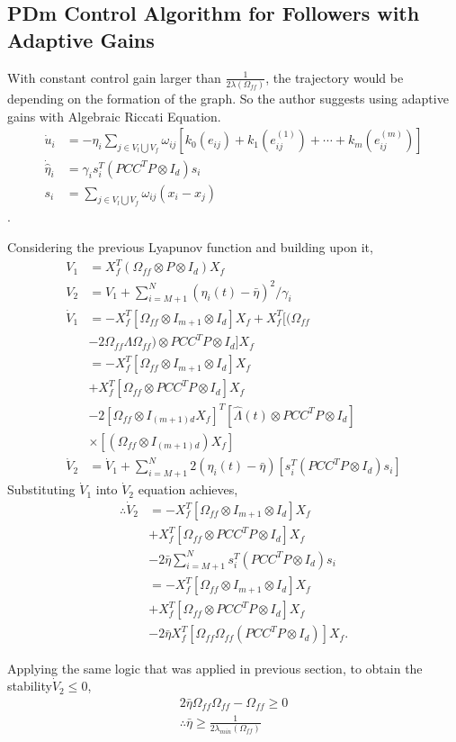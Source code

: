 \subsection*{PDm Control Algorithm for Followers with Adaptive Gains} \label{PDm_Control_Algorithm_Followers_with_Adaptive_gains}

 With constant control gain larger than $\frac{1}{2\lambda(\Omega_{ff})}$, the trajectory would be depending on the formation of the graph. So the author suggests using adaptive gains with Algebraic Riccati Equation. 
 \begin{align*}
   \dot u_i &= -\eta_i \sum_{j \in V_l\bigcup V_f } \omega_{ij}[k_0(e_{ij}) + k_1(e_{ij}^{(1)}) + \cdots +k_m(e_{ij}^{(m)})]\\
   \dot {\hat \eta}_i &=\gamma_i s_i^T(PCC^TP \otimes I_d)s_i\\
   s_i &= \sum_{j \in V_l \bigcup V_f} \omega_{ij}(x_i - x_j)
 \end{align*}.

 Considering the previous Lyapunov function and building upon it, 
 \begin{align*}
   V_{1} &= X_f^T (\Omega_{ff} \otimes P \otimes I_d) X_f\\
   V_{2} &= V_{1} + \sum_{i = M+1}^{N}(\hat \eta_i(t) - \bar \eta)^2/\gamma_i\\
   \dot V_{1} &= - X_f^T [\Omega_{ff}\otimes I_{m+1} \otimes I_d] X_f + X_f^T [(\Omega_{ff} \\
   &- 2\Omega_{ff}\Lambda\Omega_{ff})\otimes PCC^TP \otimes I_d]X_f\\
   &=- X_f^T [\Omega_{ff}\otimes I_{m+1} \otimes I_d] X_f \\
   &+X_f^T [\Omega_{ff}\otimes PCC^TP \otimes I_d]X_f\\
   &- 2[\Omega_{ff}\otimes I_{(m+1)d}X_f]^T[\hat \Lambda(t) \otimes PCC^TP \otimes I_d]\\
   &\times [(\Omega_{ff}\otimes I_{(m+1)d})X_f]\\
   \dot V_{2} &= \dot V_{1} + \sum_{i = M+1}^{N} 2(\hat \eta_i(t) - \bar \eta)[s_i^T(PCC^TP \otimes I_d)s_i]
 \end{align*}
 Substituting $\dot V_1$ into $\dot V_2$ equation achieves, 
 \begin{align*}
   \therefore \dot V_{2} &=- X_f^T [\Omega_{ff}\otimes I_{m+1} \otimes I_d] X_f\\
   & + X_f^T [\Omega_{ff}\otimes PCC^TP \otimes I_d]X_f\\
   & - 2\bar \eta \sum_{i = M+1}^{N} s_i^T(PCC^TP \otimes I_d)s_i\\
   &=- X_f^T [\Omega_{ff}\otimes I_{m+1} \otimes I_d] X_f\\
   & + X_f^T [\Omega_{ff}\otimes PCC^TP \otimes I_d]X_f\\
   & - 2\bar \eta X_f^T[\Omega_{ff}\Omega_{ff}(PCC^TP \otimes I_d)]X_f.
 \end{align*}
 
 Applying the same logic that was applied in previous section, to obtain the stability$\dot V_{2} \leq 0$,
 \begin{align*}
   2\bar \eta \Omega_{ff}\Omega_{ff} - \Omega_{ff} \geq 0\\
   \therefore \bar \eta \geq \frac{1}{2\lambda_{min}(\Omega_{ff})}
 \end{align*}

